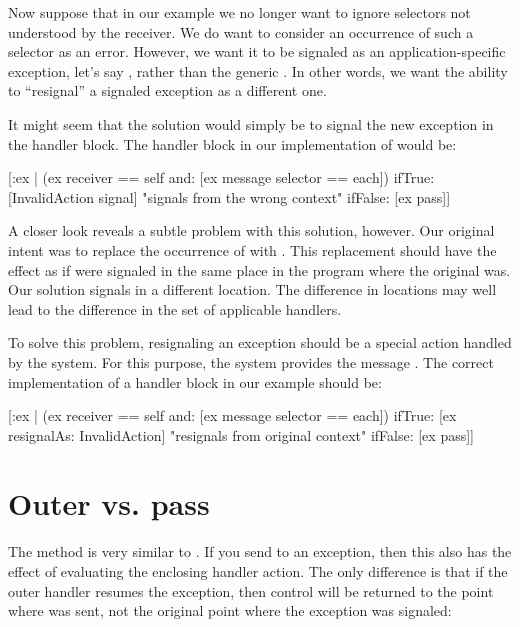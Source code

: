 \documentclass[a4paper,10pt,twoside]{book}
\begin{document}
Now suppose that in our  example we no longer want to ignore selectors not understood by the receiver. We do want to consider an occurrence of such a selector as an error. However, we want it to be signaled as an application-specific exception, let's say , rather than the generic . In other words, we want the ability to ``resignal'' a signaled exception as a different one.

It might seem that the solution would simply be to signal the new exception in the handler block. The handler block in our implementation of  would be:

\begin{code}{}
[:ex | (ex receiver == self and: [ex message selector == each])
	ifTrue: [InvalidAction signal]    "signals from the wrong context"
	ifFalse: [ex pass]]
\end{code}

A closer look reveals a subtle problem with this solution, however. Our original intent was to replace the occurrence of  with . This replacement should have the effect as if  were signaled in the same place in the program where the original  was. Our solution signals  in a different location. The difference in locations may well lead to the difference in the set of applicable handlers.

To solve this problem, resignaling an exception should be a special action handled by the system. For this purpose, the system provides the message . The correct implementation of a handler block in our  example should be:

\begin{code}{}
 [:ex |  (ex receiver == self and: [ex message selector == each])
	ifTrue: [ex resignalAs: InvalidAction]    "resignals from original context"
	ifFalse: [ex pass]]
\end{code}

\section{Outer vs. pass}

The method  is very similar to . If you send  to an exception, then this also has the effect of evaluating the enclosing handler action. The only difference is that if the outer handler resumes the exception, then control will be returned to the point where  was sent, not the original point where the exception was signaled:
\end{document}
